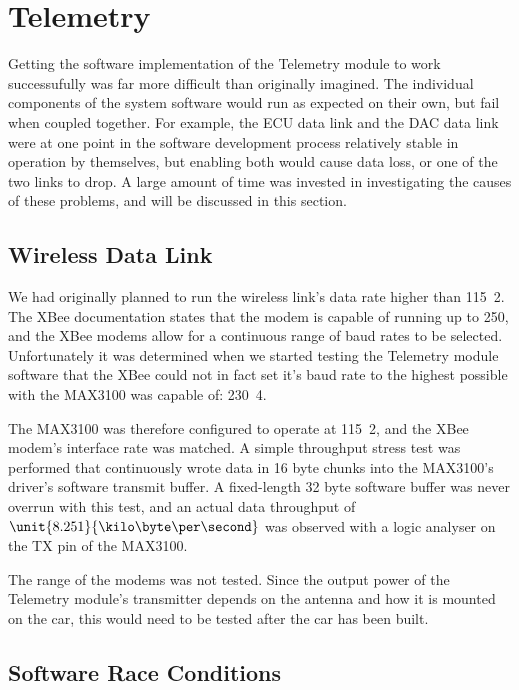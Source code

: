 \section{Telemetry}

Getting the software implementation of the Telemetry module to work successufully was far more difficult than originally imagined. The individual components of the system software would run as expected on their own, but fail when coupled together. For example, the ECU data link and the DAC data link were at one point in the software development process relatively stable in operation by themselves, but enabling both would cause data loss, or one of the two links to drop. A large amount of time was invested in investigating the causes of these problems, and will be discussed in this section.

\subsection{Wireless Data Link}

We had originally planned to run the wireless link's data rate higher than \unit{115.2}{\kilo\bit\per\second}. The XBee documentation states that the modem is capable of running up to \unit{250}{\kilo\bit\per\second}, and the XBee modems allow for a continuous range of baud rates to be selected. Unfortunately it was determined when we started testing the Telemetry module software that the XBee could not in fact set it's baud rate to the highest possible with the MAX3100 was capable of: \unit{230.4}{\kilo\bit\per\second}.

The MAX3100 was therefore configured to operate at \unit{115.2}{\kilo\bit\per\second}, and the XBee modem's interface rate was matched. A simple throughput stress test was performed that continuously wrote data in 16 byte chunks into the MAX3100's driver's software transmit buffer. A fixed-length 32 byte software buffer was never overrun with this test, and an actual data throughput of $\unit{8.251}{\kilo\byte\per\second}$ was observed with a logic analyser on the TX pin of the MAX3100.

The range of the modems was not tested. Since the output power of the Telemetry module's transmitter depends on the antenna and how it is mounted on the car, this would need to be tested after the car has been built.

\subsection{Software Race Conditions}

